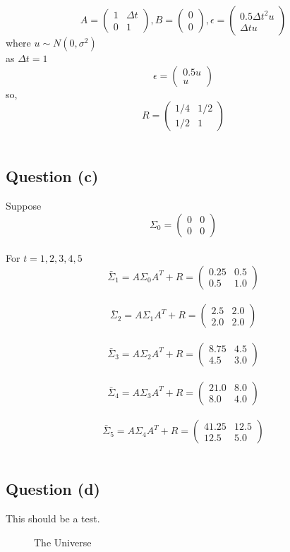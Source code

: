 \documentclass{article}
\begin{document}
$$A = \begin{pmatrix}
1 & \Delta t\\
0 & 1 
\end{pmatrix}, 
B = 
\begin{pmatrix}
0 \\
0
\end{pmatrix}, 
\epsilon = 
\begin{pmatrix}
0.5{\Delta t}^2 u\\
\Delta t u
\end{pmatrix}
$$ where $u\sim{N(0, \sigma^2)}$\\
as $\Delta t = 1$\\
$$
\epsilon = 
\begin{pmatrix}
0.5u\\
u
\end{pmatrix}
$$
so,
$$
R = 
\begin{pmatrix}
1/4 & 1/2\\
1/2 & 1
\end{pmatrix}
$$\\




\subsection{Question (c)}
Suppose $$ 
\Sigma_0 = 
\begin{pmatrix}
0&0\\0&0
\end{pmatrix}
$$\\ 
For $t = 1, 2, 3, 4, 5$\\
$$ 
\bar{\Sigma}_1 = A\Sigma_0A^{T}+R=\begin{pmatrix}
0.25 & 0.5 \\
0.5  & 1.0
\end{pmatrix}
$$\\
$$ 
\bar{\Sigma}_2 = A\Sigma_1A^{T}+R=\begin{pmatrix}
2.5 & 2.0 \\
2.0  & 2.0
\end{pmatrix}
$$\\
$$ 
\bar{\Sigma}_3 = A\Sigma_2A^{T}+R=\begin{pmatrix}
8.75 & 4.5 \\
4.5  & 3.0
\end{pmatrix}
$$\\
$$ 
\bar{\Sigma}_4 = A\Sigma_3A^{T}+R=\begin{pmatrix}
21.0 & 8.0 \\
8.0  & 4.0
\end{pmatrix}
$$\\
$$ 
\bar{\Sigma}_5 = A\Sigma_4A^{T}+R=\begin{pmatrix}
41.25 & 12.5 \\
12.5  & 5.0
\end{pmatrix}
$$\\



\subsection{Question (d)}

This should be a test. 


\begin{figure}[h!]
\centering


\caption{The Universe}
\label{fig:Uncertain}
\end{figure}
\end{document}
